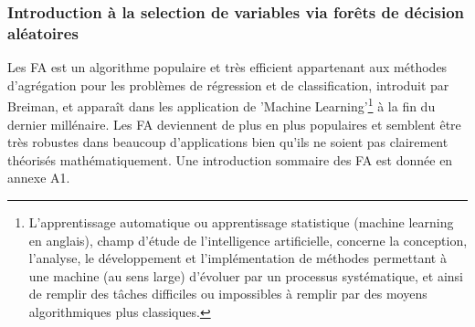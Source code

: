 	\subsubsection{Introduction à la selection de variables via forêts de décision aléatoires}
	Les FA est un algorithme populaire et très efficient appartenant aux méthodes d'agrégation pour les problèmes de régression et de classification, introduit par Breiman\cite{BREI01}, et apparaît dans les application de 'Machine Learning'\footnote{L'apprentissage automatique ou apprentissage statistique (machine learning en anglais), champ d'étude de l'intelligence artificielle, concerne la conception, l'analyse, le développement et l'implémentation de méthodes permettant à une machine (au sens large) d'évoluer par un processus systématique, et ainsi de remplir des tâches difficiles ou impossibles à remplir par des moyens algorithmiques plus classiques.} à la fin du dernier millénaire\cite{DITRI99}. Les FA deviennent de plus en plus populaires et semblent être très robustes dans beaucoup d'applications bien qu'ils ne soient pas clairement théorisés mathématiquement\cite{BIA08}. Une introduction sommaire des FA est donnée en annexe A1.
	\par

